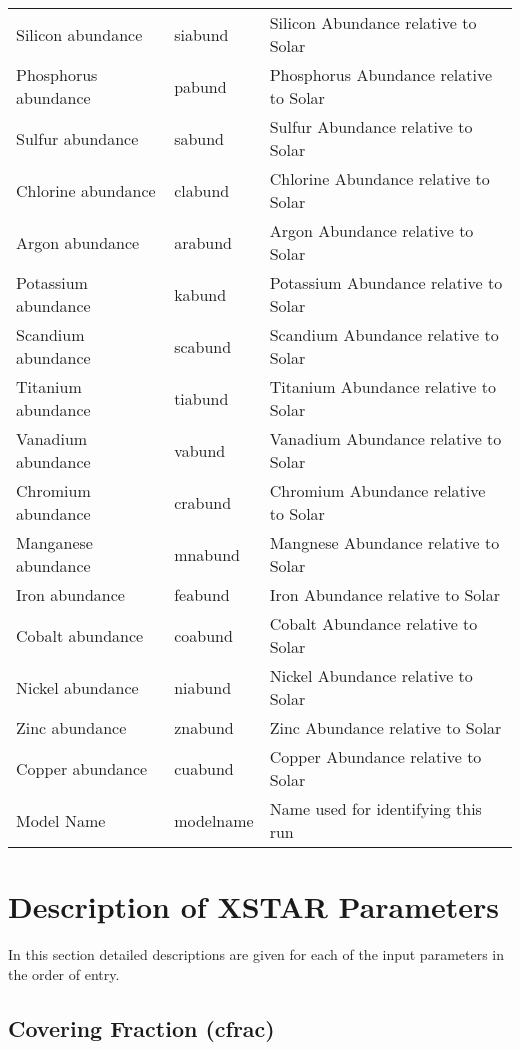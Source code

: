 \begin{tabular}{lll}
    Silicon abundance & siabund & Silicon Abundance relative to Solar  \\ 
    Phosphorus abundance & pabund & Phosphorus Abundance relative to Solar  \\ 
    Sulfur abundance & sabund & Sulfur Abundance relative to Solar  \\ 
    Chlorine abundance & clabund & Chlorine Abundance relative to Solar  \\ 
    Argon abundance & arabund & Argon Abundance relative to Solar  \\ 
    Potassium abundance & kabund & Potassium Abundance relative to Solar  \\ 
    Scandium abundance & scabund & Scandium Abundance relative to Solar  \\ 
    Titanium abundance & tiabund & Titanium Abundance relative to Solar  \\ 
    Vanadium abundance & vabund & Vanadium Abundance relative to Solar  \\ 
    Chromium abundance & crabund & Chromium Abundance relative to Solar  \\ 
    Manganese abundance & mnabund & Mangnese Abundance relative to Solar  \\ 
    Iron abundance & feabund & Iron Abundance relative to Solar  \\ 
    Cobalt abundance & coabund & Cobalt Abundance relative to Solar  \\ 
    Nickel abundance & niabund & Nickel Abundance relative to Solar  \\ 
    Zinc abundance & znabund & Zinc Abundance relative to Solar  \\ 
    Copper abundance & cuabund & Copper Abundance relative to Solar  \\ 
    Model Name & modelname & Name used for identifying this run \\
\end{tabular}

\section{Description of XSTAR Parameters}

In this section detailed descriptions are given for each of the input
parameters in the order of entry.  

\subsection{Covering Fraction (cfrac)}

